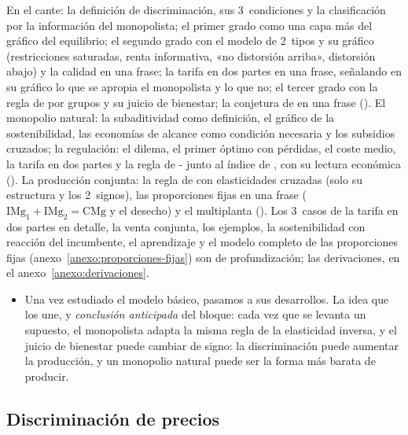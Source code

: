 \documentclass[11pt]{article}
\begin{document}
\begin{notaopositor}
En el cante: la definición de discriminación, sus 3~condiciones y la clasificación por la información del monopolista; el primer grado como una capa más del gráfico del equilibrio; el segundo grado con el modelo de 2~tipos y su gráfico (restricciones saturadas, renta informativa, «no distorsión arriba», distorsión abajo) y la calidad en una frase; la tarifa en dos partes en una frase, señalando en su gráfico lo que se apropia el monopolista y lo que no; el tercer grado con la regla de  por grupos y su juicio de bienestar; la conjetura de  en una frase (). El monopolio natural: la subaditividad como definición, el gráfico de la sostenibilidad, las economías de alcance como condición necesaria y los subsidios cruzados; la regulación: el dilema, el primer óptimo con pérdidas, el coste medio, la tarifa en dos partes y la regla de - junto al índice de , con su lectura económica (). La producción conjunta: la regla de  con elasticidades cruzadas (solo su estructura y los 2~signos), las proporciones fijas en una frase ($\mathrm{IMg}_1+\mathrm{IMg}_2=\mathrm{CMg}$ y el desecho) y el multiplanta (). Los 3~casos de la tarifa en dos partes en detalle, la venta conjunta, los ejemplos, la sostenibilidad con reacción del incumbente, el aprendizaje y el modelo completo de las proporciones fijas (anexo~\ref{anexo:proporciones-fijas}) son de profundización; las derivaciones, en el anexo~\ref{anexo:derivaciones}.
\end{notaopositor}

\begin{itemize}
\item Una vez estudiado el modelo básico, pasamos a sus desarrollos. La idea que los une, y \emph{conclusión anticipada} del bloque: cada vez que se levanta un supuesto, el monopolista adapta la misma regla de la elasticidad inversa, y el juicio de bienestar puede cambiar de signo: la discriminación puede aumentar la producción, y un monopolio natural puede ser la forma más barata de producir.
\end{itemize}

\subsection{Discriminación de precios}\label{sec:discriminacion-precios}
\end{document}
